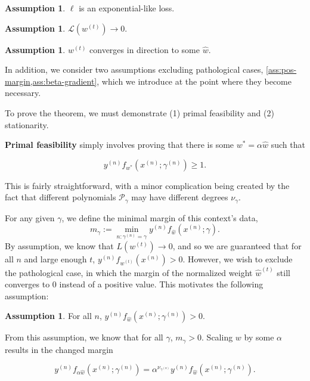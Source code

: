 \documentclass{article}
\theoremstyle{plain}
\theoremstyle{definition}
\newtheorem{assumption}[theorem]{Assumption}
\theoremstyle{remark}
\begin{document}
\begin{assumption}
\label{ass:exp-like}
$\ell$ is an exponential-like loss.
\end{assumption}

\begin{assumption}
\label{ass:loss-to-zero}
$\mathcal{L}(w^{(t)})\to0.$
\end{assumption}

\begin{assumption}
\label{ass:w-converges}
$w^{(t)}$ converges in direction to some $\hat{w}$.
\end{assumption}

In addition, we consider two assumptions excluding pathological cases, \cref{ass:pos-margin,ass:beta-gradient}, which we introduce at the point where they become necessary.

To prove the theorem, we must demonstrate (1) primal feasibility and (2) stationarity.

\textbf{Primal feasibility} simply involves proving that there is some $w^{\ast}=\alpha\hat{w}$ such that

$$
y^{(n)}f_{w^{\ast}}(x^{(n)};\gamma^{(n)})\geq1.
$$

This is fairly straightforward, with a minor complication being created by the fact that different polynomials $\mathcal{P}_{\gamma}$ may have different degrees $\nu_{\gamma}$.

For any given $\gamma$, we define the minimal margin of this context's data,
\begin{equation}
    m_{\gamma}:=\min_{n:\gamma^{(n)}=\gamma}y^{(n)}f_{\hat{w}}(x^{(n)};\gamma).
\end{equation}
By assumption, we know that $L(w^{(t)})\to 0$, and so we are guaranteed that for all $n$ and large enough $t$, $y^{(n)}f_{w^{(t)}}(x^{(n)})>0$.
However, we wish to exclude the pathological case, in which the margin of the normalized weight $\hat{w}^{(t)}$ still converges to $0$ instead of a positive value.
This motivates the following assumption:

\begin{assumption}
\label{ass:pos-margin}
For all $n$, $y^{(n)}f_{ \hat{w}}(x^{(n)};\gamma^{(n)})>0$.
\end{assumption}

From this assumption, we know that for all $\gamma$, $m_{\gamma}>0$.
Scaling $w$ by some $\alpha$ results in the changed margin

$$
y^{(n)}f_{\alpha\hat{w}}(x^{(n)};\gamma^{(n)})=\alpha^{\nu_{\gamma^{(n)}}}y^{(n)}f_{\hat{w}}(x^{(n)};\gamma^{(n)}).
$$
\end{document}
